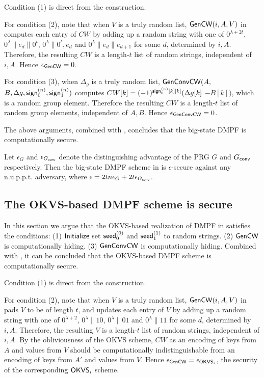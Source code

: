 Condition (1) is direct from the construction. 

For condition (2), note that when $V$ is a truly random list, \linebreak${\sf Gen}{\sf CW}(i,A,V)$ in  computes each entry of $CW$ by adding up a random string with one of $0^{\lambda+2t}$, $0^\lambda\|e_d\|0^t$, $0^\lambda\|0^t, e_d$ and $0^\lambda\|e_d\|e_{d+1}$ for some $d$, determined by $i,A$. Therefore, the resulting $CW$ is a length-$t$ list of random strings, independent of $i,A$. Hence $\epsilon_{{\sf Gen}{\sf CW}} = 0$. 

For condition (3), when $\Delta_g$ is a truly random list, ${\sf Gen}{\sf Conv}{\sf CW}(A,$\linebreak$B,\Delta g,{\sf sign}_0^{(n)},{\sf sign}_1^{(n)})$ computes $CW[k] = (-1)^{{\sf sign}_0^{(n)}[k][k]}(\Delta g[k] $\linebreak
$- B[k])$, which is a random group element. Therefore the resulting $CW$ is a length-$t$ list of random group elements, independent of $A,B$. Hence $\epsilon_{{\sf Gen}{\sf Conv}{\sf CW}} = 0$. 

The above arguments, combined with , concludes that the big-state DMPF is computationally secure. 

\begin{theorem}\label{thm:big-state_secure}
    Let $\epsilon_G$ and $\epsilon_{G_{\sf conv}}$ denote the distinguishing advantage of the PRG $G$ and $G_{\sf conv}$ respectively. Then the big-state DMPF scheme in  is $\epsilon$-secure against any n.u.p.p.t. adversary, where $\epsilon = 2tn\epsilon_G+2t\epsilon_{G_{\sf conv}}$. 
\end{theorem}

\subsection{The OKVS-based DMPF scheme is secure}\label{sec:OKVS_DMPF_security_proof}
In this section we argue that the OKVS-based realization of DMPF in  satisfies the conditions: (1) $\sf Initialize$ set ${\sf seed}_0^{(0)}$ and ${\sf seed}_1^{(1)}$ to random strings. (2) ${\sf Gen}{\sf CW}$ is computationally hiding. (3) ${\sf Gen}{\sf Conv}{\sf CW}$ is computationally hiding. Combined with , it can be concluded that the OKVS-based DMPF scheme is computationally secure. 

Condition (1) is direct from the construction. 

For condition (2), note that when $V$ is a truly random list, \linebreak${\sf Gen}{\sf CW}(i,A,V)$ in  pads $V$ to be of length $t$, and updates each entry of $V$ by adding up a random string with one of $0^{\lambda+2}$, $0^\lambda\|10$, $0^\lambda\|01$ and $0^\lambda\|11$ for some $d$, determined by $i,A$. Therefore, the resulting $V$ is a length-$t$ list of random strings, independent of $i,A$. By the obliviousness of the OKVS scheme, $CW$ as an encoding of keys from $A$ and values from $V$ should be computationally indistinguishable from an encoding of keys from $A'$ and values from $V$. Hence $\epsilon_{{\sf Gen}{\sf CW}} = \epsilon_{{\sf OKVS}_i}$, the security of the corresponding ${\sf OKVS}_i$ scheme. 

